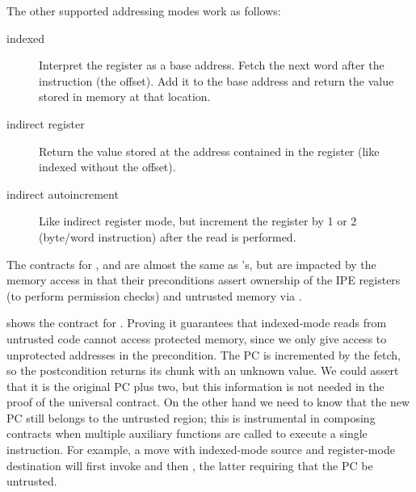 \noindent
The other supported addressing modes work as follows:
\begin{description}
\item[indexed] Interpret the register as a base address. Fetch the next word after the instruction (the offset). Add it to the base address and return the value stored in memory at that location.
\item[indirect register] Return the value stored at the address contained in the register (like indexed without the offset).
\item[indirect autoincrement] Like indirect register mode, but increment the register by 1 or 2 (byte/word instruction) after the read is performed.
\end{description}
The contracts for ,  and  are almost the same as 's, but are impacted by the memory access in that their preconditions assert ownership of the IPE registers (to perform permission checks) and untrusted memory via .


 shows the contract for . Proving it guarantees that indexed-mode reads from untrusted code cannot access protected memory, since we only give access to unprotected addresses in the precondition. The PC is incremented by the fetch, so the postcondition returns its chunk with an unknown value. We could assert that it is the original PC plus two, but this information is not needed in the proof of the universal contract. On the other hand we need to know that the new PC still belongs to the untrusted region; this is instrumental in composing contracts when multiple auxiliary functions are called to execute a single instruction. For example, a move with indexed-mode source and register-mode destination will first invoke  and then , the latter requiring that the PC be untrusted.


